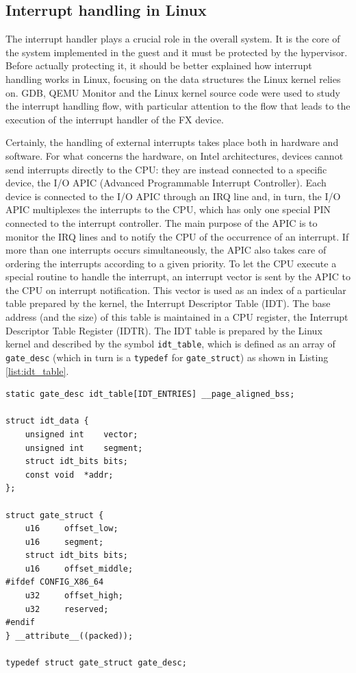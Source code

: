 \subsection{Interrupt handling in Linux}
The interrupt handler plays a crucial role in the overall system. It is the core of the system implemented in the guest and it must be protected by the hypervisor. Before actually protecting it, it should be better explained how interrupt handling works in Linux, focusing on the data structures the Linux kernel relies on. GDB, QEMU Monitor and the Linux kernel source code were used to study the interrupt handling flow, with particular attention to the flow that leads to the execution of the interrupt handler of the FX device. 
\par 
Certainly, the handling of external interrupts takes place both in hardware and software. For what concerns the hardware, on Intel architectures, devices cannot send interrupts directly to the CPU: they are instead connected to a specific device, the I/O APIC (Advanced Programmable Interrupt Controller). Each device is connected to the I/O APIC through an IRQ line and, in turn, the I/O APIC multiplexes the interrupts to the CPU, which has only one special PIN connected to the interrupt controller. The main purpose of the APIC is to monitor the IRQ lines and to notify the CPU of the occurrence of an interrupt. If more than one interrupts occurs simultaneously, the APIC also takes care of ordering the interrupts according to a given priority. To let the CPU execute a special routine to handle the interrupt, an interrupt vector is sent by the APIC to the CPU on interrupt notification. This vector is used as an index of a particular table prepared by the kernel, the Interrupt Descriptor Table (IDT). The base address (and the size) of this table is maintained in a CPU register, the Interrupt Descriptor Table Register (IDTR). The IDT table is prepared by the Linux kernel and described by the symbol \texttt{idt\_table}, which is defined as an array of \texttt{gate\_desc} (which in turn is a \texttt{typedef} for \texttt{gate\_struct}) as shown in Listing \ref{list:idt_table}.
\begin{lstlisting}[style=c, caption={Definition of the idt\_table}, label={list:idt_table}]
static gate_desc idt_table[IDT_ENTRIES] __page_aligned_bss;

struct idt_data {
	unsigned int	vector;
	unsigned int	segment;
	struct idt_bits	bits;
	const void	*addr;
};

struct gate_struct {
	u16		offset_low;
	u16		segment;
	struct idt_bits	bits;
	u16		offset_middle;
#ifdef CONFIG_X86_64
	u32		offset_high;
	u32		reserved;
#endif
} __attribute__((packed));

typedef struct gate_struct gate_desc;
\end{lstlisting}
